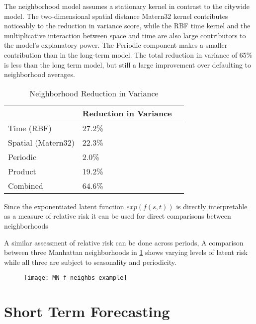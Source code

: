   The neighborhood model assumes a stationary kernel in contrast to the citywide model. The two-dimensional spatial distance Matern32 kernel contributes noticeably to the reduction in variance score, while the RBF time kernel and the multiplicative interaction between space and time are also large contributors to the model's explanatory power. The Periodic component makes a smaller contribution than in the long-term model. The total reduction in variance of 65\% is less than the long term model, but still a large improvement over defaulting to neighborhood averages. \par

  \begin{table}[]
  \centering
  \caption{Neighborhood Reduction in Variance}
  \label{variance_neighb}
  \begin{tabular}{@{}lll@{}}
  \toprule
                     & Reduction in Variance &  \\ \midrule
  Time (RBF)         & 27.2\%                &  \\
  Spatial (Matern32) & 22.3\%                &  \\
  Periodic           & 2.0\%                 &  \\
  Product            & 19.2\%                &  \\
  Combined           & 64.6\%                &  \\ \bottomrule
  \end{tabular}
  \end{table}



Since the exponentiated latent function $exp(f(s,t))$ is directly interpretable as a measure of relative risk it can be used for direct comparisons between neighborhoods \par


A similar assessment of relative risk can be done across periods, A comparison between three Manhattan neighborhoods in \ref{MN_f_neighbs_example} shows varying levels of latent risk while all three are subject to seasonality and periodicity.

\begin{figure}[h!]
  \centering
  \caption{}
  \label{MN_f_neighbs_example}
  \texttt{[image: MN\_f\_neighbs\_example]}
\end{figure}



\section{Short Term Forecasting}

